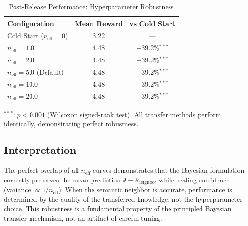 \begin{table}[h]
\centering
\caption{Post-Release Performance: Hyperparameter Robustness}
\label{tab:hyperparameter_robustness}
\begin{tabular}{lcc}
\toprule
\textbf{Configuration} & \textbf{Mean Reward} & \textbf{vs Cold Start} \\
\midrule
Cold Start ($n_{\text{eff}}=0$) & 3.22 & --- \\
\midrule
$n_{\text{eff}}=1.0$ & 4.48 & +39.2\%$^{***}$ \\
$n_{\text{eff}}=2.0$ & 4.48 & +39.2\%$^{***}$ \\
$n_{\text{eff}}=5.0$ (Default) & 4.48 & +39.2\%$^{***}$ \\
$n_{\text{eff}}=10.0$ & 4.48 & +39.2\%$^{***}$ \\
$n_{\text{eff}}=20.0$ & 4.48 & +39.2\%$^{***}$ \\
\bottomrule
\end{tabular}
\vspace{0.5em}

\footnotesize
$^{***}$: $p < 0.001$ (Wilcoxon signed-rank test). All transfer methods 
perform identically, demonstrating perfect robustness.
\end{table}

\subsection{Interpretation}

The perfect overlap of all $n_{\text{eff}}$ curves demonstrates that the 
Bayesian formulation correctly preserves the mean prediction 
$\hat{\theta} = \theta_{\text{neighbor}}$ while scaling confidence 
(variance $\propto 1/n_{\text{eff}}$). When the semantic neighbor is 
accurate, performance is determined by the quality of the transferred 
knowledge, not the hyperparameter choice. This robustness is a fundamental 
property of the principled Bayesian transfer mechanism, not an artifact 
of careful tuning.

